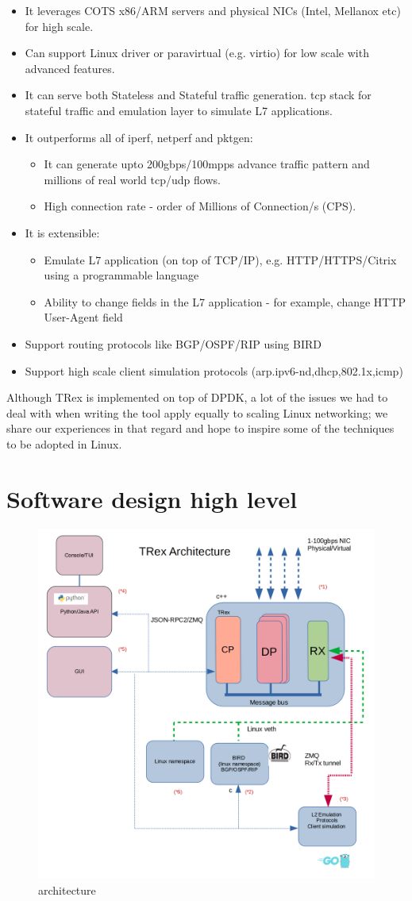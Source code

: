 \documentclass[conference]{IEEEtran}
\begin{document}
\begin{itemize}
\item It leverages COTS x86/ARM servers and physical NICs (Intel, Mellanox etc) for high scale.
\item Can support Linux driver or paravirtual (e.g. virtio) for low scale with advanced features. 
\item  It can serve both Stateless and Stateful traffic generation.
  tcp stack for stateful traffic and emulation layer to simulate L7 applications.
\item It outperforms all of iperf, netperf and pktgen: 
   \begin{itemize}
    \item It can generate upto 200gbps/100mpps advance traffic pattern and millions of real
      world tcp/udp flows.
    \item High connection rate - order of Millions of Connection/s (CPS).
  \end{itemize}
\item It is extensible:
\begin{itemize}
    \item Emulate L7 application (on top of TCP/IP),
       e.g. HTTP/HTTPS/Citrix using a programmable language
    \item Ability to change fields in the L7 application - for example,
      change HTTP User-Agent field
\end{itemize}
\item Support routing protocols like BGP/OSPF/RIP using BIRD \cite{b4}
\item Support high scale client simulation protocols (arp.ipv6-nd,dhcp,802.1x,icmp) 
\end{itemize}
Although TRex is implemented on top of DPDK, a lot of the issues we had
to deal with when writing the tool apply equally to scaling Linux networking;
we share our experiences in that regard and hope to inspire some
of the techniques to be adopted in Linux.

\section{Software design high level}

\begin{figure}[h]
\includegraphics[width=0.4
\textwidth, center]{trex_arch_2.png}
\caption{architecture}
\label{fig:arch}
\end{figure}
\end{document}
